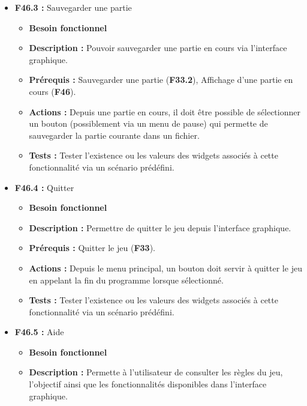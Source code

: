 \documentclass{article}
\begin{document}
\begin{itemize}
\begin{itemize}
\begin{itemize}
\begin{itemize}
                \item \textbf{Tests :} Tester l'existence ou les valeurs des widgets associés à cette fonctionnalité via un scénario prédéfini.
            \end{itemize}
            \smallskip
            \item \textbf{F46.3 :} Sauvegarder une partie
            \begin{itemize}
                \item \textbf{Besoin fonctionnel}
                \item \textbf{Description :} Pouvoir sauvegarder une partie en cours via l'interface graphique. 
                \item \textbf{Prérequis :} Sauvegarder une partie (\textbf{F33.2}), Affichage d'une partie en cours (\textbf{F46}).
                \item \textbf{Actions :} Depuis une partie en cours, il doit être possible de sélectionner un bouton (possiblement via un menu de pause) qui permette de sauvegarder la partie courante dans un fichier.
                \item \textbf{Tests :} Tester l'existence ou les valeurs des widgets associés à cette fonctionnalité via un scénario prédéfini.
            \end{itemize}
            \smallskip
            \item \textbf{F46.4 :} Quitter
            \begin{itemize}
                \item \textbf{Besoin fonctionnel}
                \item \textbf{Description :} Permettre de quitter le jeu depuis l'interface graphique.
                \item \textbf{Prérequis :} Quitter le jeu (\textbf{F33}).
                \item \textbf{Actions :} Depuis le menu principal, un bouton doit servir à quitter le jeu en appelant la fin du programme lorsque sélectionné.
                \item \textbf{Tests :} Tester l'existence ou les valeurs des widgets associés à cette fonctionnalité via un scénario prédéfini.
            \end{itemize}
            \smallskip
            \item \textbf{F46.5 :} Aide
            \begin{itemize}
                \item \textbf{Besoin fonctionnel}
                \item \textbf{Description :} Permette à l’utilisateur de consulter les règles du jeu, l’objectif ainsi que les fonctionnalités disponibles dans l’interface graphique.

\end{itemize}
\end{itemize}
\end{itemize}
\end{itemize}
\end{document}
